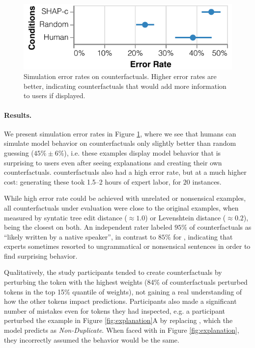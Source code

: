 \begin{figure}[t]
\centering
\includegraphics[width=1\columnwidth]{figures/err_rate.pdf}
\vspace{-15pt}
\caption{
Simulation error rates on counterfactuals. Higher error rates are better, indicating counterfactuals that would add more information to users if displayed.
}
\vspace{-10pt}
\label{fig:err_rate}
\end{figure}

\paragraph{Results.}
We present simulation error rates in Figure \ref{fig:err_rate}, where we see that humans can simulate model behavior on \cshap counterfactuals only slightly better than random guessing ($45\%\pm6\%$), i.e. these examples display model behavior that is surprising to users even after seeing explanations and creating their own counterfactuals. \chuman counterfactuals also had a high error rate, but at a much higher cost: generating these took 1.5--2 hours of expert labor, for $20$ instances.

While high error rate could be achieved with unrelated or nonsensical examples, all counterfactuals under evaluation were close to the original examples, when measured by syntatic tree edit distance ($\approx1.0$) or Levenshtein distance ($\approx0.2$), \cshap being the closest on both. An independent rater labeled $95\%$ of \cshap counterfactuals as ``likely written by a native speaker'', in contrast to $85\%$ for \chuman, indicating that experts sometimes resorted to ungrammatical or nonsensical sentences in order to find surprising behavior.

Qualitatively, the study participants tended to create counterfactuals by perturbing the token with the highest weights (84\% of counterfactuals perturbed tokens in the top 15\% quantile of weights), not gaining a real understanding of how the other tokens impact predictions. Participants also made a significant number of mistakes even for tokens they had inspected, e.g. a participant perturbed the example in Figure \ref{fig:explanation}A by replacing , which the model predicts as \emph{Non-Duplicate}. When faced with  in Figure \ref{fig:explanation}, they incorrectly assumed the behavior would be the same.

